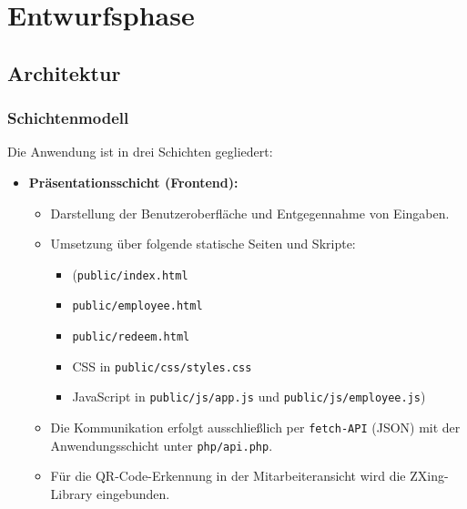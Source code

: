 \section{Entwurfsphase}
\label{sec:Entwurfsphase}

\subsection{Architektur}

\subsubsection{Schichtenmodell}
Die Anwendung ist in drei Schichten gegliedert:

\begin{itemize}
  \item \textbf{Präsentationsschicht (Frontend):}
        \renewcommand{\labelitemii}{$\rightarrow$} %
        \begin{itemize}
          \item Darstellung der Benutzeroberfläche und Entgegennahme von Eingaben.
          \item Umsetzung über folgende statische Seiten und Skripte:
                \begin{itemize}
                  \item (\texttt{public/index.html}
                  \item \texttt{public/employee.html}
                  \item \texttt{public/redeem.html}
                  \item CSS in \texttt{public/css/styles.css}
                  \item JavaScript in \texttt{public/js/app.js} und \texttt{public/js/employee.js})
                \end{itemize}
          \item Die Kommunikation erfolgt ausschließlich per \texttt{fetch-API} (\ac{JSON}) mit der Anwendungsschicht unter \texttt{php/api.php}.
          \item Für die QR-Code-Erkennung in der Mitarbeiteransicht wird die ZXing-Library eingebunden.
        \end{itemize}


\end{itemize}
